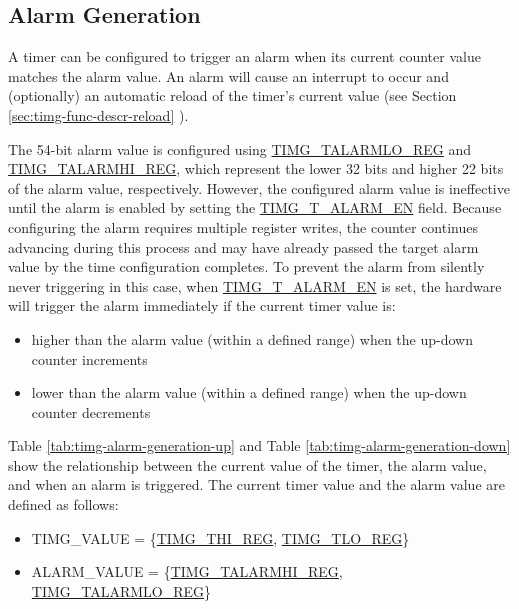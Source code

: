 \documentclass[main\_\_EN.tex]{subfiles}
\begin{document}
\subsection{Alarm Generation}

A timer can be configured to trigger an alarm when its current counter value matches the alarm value. An alarm will cause an interrupt to occur and (optionally) an automatic reload of the timer's current value (see Section \ref{sec:timg-func-descr-reload} \textit{}).

The 54-bit alarm value is configured using \hyperref[regdesc:TIMGTXALARMLOREG]{TIMG\_TALARMLO\_REG} and \hyperref[regdesc:TIMGTXALARMHIREG]{TIMG\_TALARMHI\_REG}, which represent the lower 32 bits and higher 22 bits of the alarm value, respectively. However, the configured alarm value is ineffective until the alarm is enabled by setting the \hyperref[fielddesc:TIMGTXALARMEN]{TIMG\_T\_ALARM\_EN} field. Because configuring the alarm requires multiple register writes, the counter continues advancing during this process and may have already passed the target alarm value by the time configuration completes. To prevent the alarm from silently never triggering in this case, when \hyperref[fielddesc:TIMGTXALARMEN]{TIMG\_T\_ALARM\_EN} is set, the hardware will trigger the alarm immediately if the current timer value is:


\begin{itemize}
    \item higher than the alarm value (within a defined range) when the up-down counter increments
    \item lower than the alarm value (within a defined range) when the up-down counter decrements
\end{itemize}

Table \ref{tab:timg-alarm-generation-up} \textit{} and Table \ref{tab:timg-alarm-generation-down} \textit{} show the relationship between the current value of the timer, the alarm value, and when an alarm is triggered. The current timer value and the alarm value are defined as follows:

\begin{itemize}
    \item TIMG\_VALUE = \{\hyperref[regdesc:TIMGTXHIREG]{TIMG\_THI\_REG}, \hyperref[regdesc:TIMGTXLOREG]{TIMG\_TLO\_REG}\}
    \item ALARM\_VALUE = \{\hyperref[regdesc:TIMGTXALARMHIREG]{TIMG\_TALARMHI\_REG}, \hyperref[regdesc:TIMGTXALARMLOREG]{TIMG\_TALARMLO\_REG}\}
\end{itemize}
\end{document}
